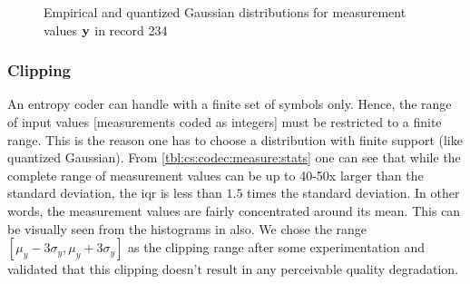\begin{figure*}[htb]
    \centering %

\label{fig:cs:codec:y:hist:200}
\end{figure*}


\begin{figure*}[htb]
    \centering %
  \centering 
\caption{Empirical and quantized Gaussian distributions for measurement values
$\mathbf{y}$ in record 234}
\label{fig:cs:codec:y:234:empirical:quantized}
\end{figure*}

\FloatBarrier

\subsubsection{Clipping}

An entropy coder can handle with a finite set of symbols
only. Hence, the range of input values [measurements
coded as integers] must be restricted to a finite range.
This is the reason one has to choose a distribution
with finite support (like quantized Gaussian).
From \cref{tbl:cs:codec:measure:stats} one can see that
while the complete range of measurement values can be
up to 40-50x larger than the standard deviation, the iqr
is less than $1.5$ times the standard deviation. In other
words, the measurement values are fairly concentrated
around its mean. This can be visually seen from the
histograms in  also.
We chose the range $[\mu_y - 3 \sigma_y, \mu_y + 3 \sigma_y]$
as the clipping range after some experimentation and validated
that this clipping doesn't result in any perceivable quality
degradation.

